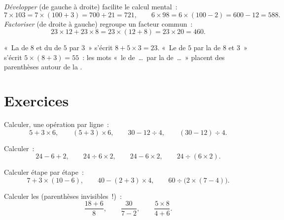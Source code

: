 \begin{example}\label{ex:g7:priorities:distributivity}
\emph{Développer} (de gauche à droite) facilite le calcul mental~:
\[
7 \times 103 = 7 \times (100 + 3) = 700 + 21 = 721,
\qquad
6 \times 98 = 6 \times (100 - 2) = 600 - 12 = 588 .
\]
\emph{Factoriser} (de droite à gauche) regroupe un facteur commun~:
\[
23 \times 12 + 23 \times 8 = 23 \times (12 + 8) = 23 \times 20 = 460 .
\]
\end{example}

\begin{example}\label{ex:g7:priorities:words}
«~La  de $8$ et du  de $5$ par $3$~» s'écrit
$8 + 5 \times 3 = 23$. «~Le  de $5$ par la  de $8$ et
$3$~» s'écrit $5 \times (8 + 3) = 55$~: les mots «~le 
de~\dots\ par la  de~\dots~» placent des parenthèses autour de
la .
\end{example}

\section{Exercices}

\begin{exercise}[$\star$]\label{exo:g7:priorities:1}
Calculer, une opération par ligne~:
\[
5 + 3 \times 6, \qquad
(5 + 3) \times 6, \qquad
30 - 12 \div 4, \qquad
(30 - 12) \div 4 .
\]
\end{exercise}

\begin{exercise}[$\star$]\label{exo:g7:priorities:2}
Calculer~:
\[
24 - 6 + 2, \qquad
24 \div 6 \times 2, \qquad
24 - 6 \times 2, \qquad
24 \div (6 \times 2).
\]
\end{exercise}

\begin{exercise}[$\star$]\label{exo:g7:priorities:3}
Calculer étape par étape~:
\[
7 + 3 \times (10 - 6), \qquad
40 - (2 + 3) \times 4, \qquad
60 \div \bigl(2 \times (7 - 4)\bigr).
\]
\end{exercise}

\begin{exercise}[$\star$]\label{exo:g7:priorities:4}
Calculer les  (parenthèses invisibles~!)~:
\[
\frac{18 + 6}{8}, \qquad
\frac{30}{7 - 2}, \qquad
\frac{5 \times 8}{4 + 6} .
\]
\end{exercise}

